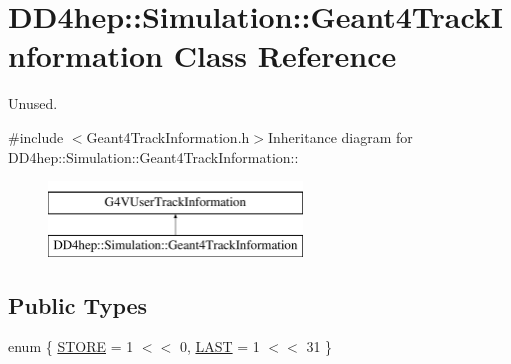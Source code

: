 \hypertarget{class_d_d4hep_1_1_simulation_1_1_geant4_track_information}{
\section{DD4hep::Simulation::Geant4TrackInformation Class Reference}
\label{class_d_d4hep_1_1_simulation_1_1_geant4_track_information}
}


Unused.  


{\ttfamily \#include $<$Geant4TrackInformation.h$>$}Inheritance diagram for DD4hep::Simulation::Geant4TrackInformation::\begin{figure}[H]
\begin{center}
\leavevmode
\includegraphics[height=2cm]{class_d_d4hep_1_1_simulation_1_1_geant4_track_information}
\end{center}
\end{figure}
\subsection*{Public Types}
\begin{DoxyCompactItemize}
\item 
enum \{ \hyperlink{class_d_d4hep_1_1_simulation_1_1_geant4_track_information_afa005d7916d394b13aeaee68fd11eb39ae708756d2130a012dfbf610b5a185013}{STORE} =  1 $<$$<$ 0, 
\hyperlink{class_d_d4hep_1_1_simulation_1_1_geant4_track_information_afa005d7916d394b13aeaee68fd11eb39a81ac210b79462efbc46ab716df41e891}{LAST} =  1 $<$$<$ 31
 \}
\end{DoxyCompactItemize}
